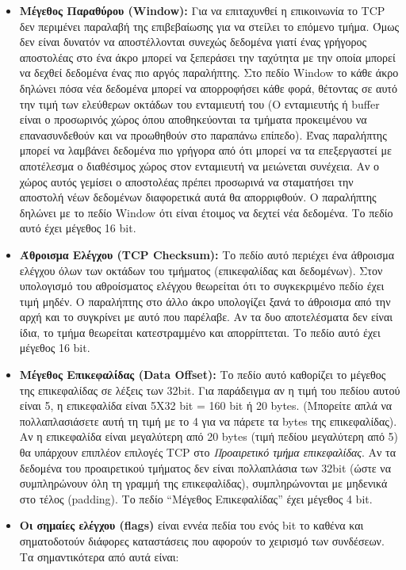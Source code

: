 \begin{itemize}
\item \textbf{Μέγεθος Παραθύρου (Window):} Για να επιταχυνθεί η επικοινωνία το TCP δεν περιμένει παραλαβή της επιβεβαίωσης για να στείλει το επόμενο τμήμα. Όμως δεν είναι δυνατόν να αποστέλλονται συνεχώς δεδομένα γιατί ένας γρήγορος αποστολέας στο ένα άκρο μπορεί να ξεπεράσει την ταχύτητα με την οποία μπορεί να δεχθεί δεδομένα ένας πιο αργός παραλήπτης. Στο πεδίο Win\-dow το κάθε άκρο δηλώνει πόσα νέα δεδομένα μπορεί να απορροφήσει κάθε φορά, θέτοντας σε αυτό την τιμή των ελεύθερων οκτάδων του ενταμιευτή του (Ο ενταμιευτής ή buffer είναι ο προσωρινός χώρος όπου αποθηκεύονται τα τμήματα προκειμένου να επανασυνδεθούν και να προωθηθούν στο παραπάνω επίπεδο). Ένας παραλήπτης μπορεί να λαμβάνει δεδομένα πιο γρήγορα από ότι μπορεί να τα επεξεργαστεί με αποτέλεσμα ο διαθέσιμος χώρος στον ενταμιευτή να μειώνεται συνέχεια. Αν ο χώρος αυτός γεμίσει ο αποστολέας πρέπει προσωρινά να σταματήσει την αποστολή νέων δεδομένων διαφορετικά αυτά θα απορριφθούν. Ο παραλήπτης δηλώνει με το πεδίο Window ότι είναι έτοιμος να δεχτεί νέα δεδομένα. Το πεδίο αυτό έχει μέγεθος 16 bit.
\item \textbf{Άθροισμα Ελέγχου (TCP Checksum):} Το πεδίο αυτό περιέχει ένα άθροισμα ελέγχου όλων των οκτάδων του τμήματος (επικεφαλίδας και δεδομένων). Στον υπολογισμό του αθροίσματος ελέγχου θεωρείται ότι το συγκεκριμένο πεδίο έχει τιμή μηδέν. Ο παραλήπτης στο άλλο άκρο υπολογίζει ξανά το άθροισμα από την αρχή και το συγκρίνει με αυτό που παρέλαβε. Αν τα δυο αποτελέσματα δεν είναι ίδια, το τμήμα θεωρείται κατεστραμμένο και απορρίπτεται. Το πεδίο αυτό έχει μέγεθος 16 bit.
\item \textbf{Μέγεθος Επικεφαλίδας (Data Offset):} Το πεδίο αυτό καθορίζει το μέγεθος της επικεφαλίδας σε λέξεις των 32bit. Για παράδειγμα αν η τιμή του πεδίου αυτού είναι 5, η επικεφαλίδα είναι 5Χ32 bit = 160 bit ή 20 bytes. (Μπορείτε απλά να πολλαπλασιάσετε αυτή τη τιμή με το 4 για να πάρετε τα bytes της επικεφαλίδας). Αν η επικεφαλίδα είναι μεγαλύτερη από 20 bytes (τιμή πεδίου μεγαλύτερη από 5) θα υπάρχουν επιπλέον επιλογές TCP στο \emph{Προαιρετικό τμήμα επικεφαλίδας}. Αν τα δεδομένα του προαιρετικού τμήματος δεν είναι πολλαπλάσια των 32bit (ώστε να συμπληρώνουν όλη τη γραμμή της επικεφαλίδας), συμπληρώνονται με μηδενικά στο τέλος (padding). Το πεδίο ``Μέγεθος Επικεφαλίδας'' έχει μέγεθος 4 bit.
\item \textbf{Οι σημαίες ελέγχου (flags)} είναι εννέα πεδία του ενός bit το καθένα και σηματοδοτούν διάφορες καταστάσεις που αφορούν το χειρισμό των συνδέσεων.  Τα σημαντικότερα από αυτά είναι:

\end{itemize}
